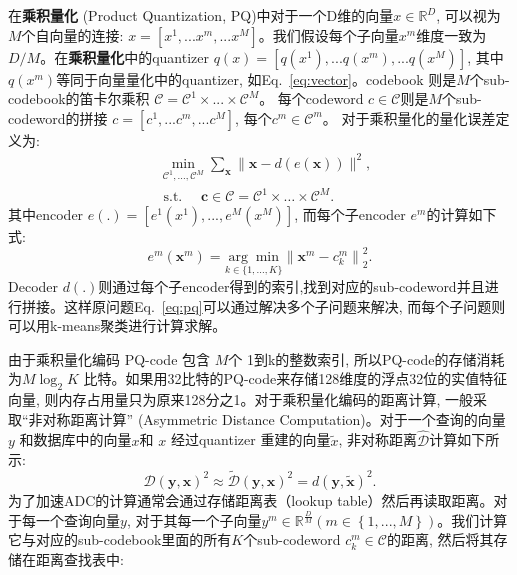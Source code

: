 在\textbf{乘积量化} (Product Quantization, PQ)中对于一个D维的向量$x \in \mathbb{R}^D$, 可以视为$M$个自向量的连接: $x = \left[ x^1,...x^m,...x^M \right]$。我们假设每个子向量$x^m$维度一致为$D/M$。在\textbf{乘积量化}中的quantizer $q(x) = \left[ q(x^1),...q(x^m),...q(x^M) \right]$, 其中 $q(x^m)$等同于向量量化中的quantizer, 如Eq.~\ref{eq:vector}。codebook 则是$M$个sub-codebook的笛卡尔乘积 $\mathcal{C} = \mathcal{C}^1 \times ... \times \mathcal{C}^M$。 每个codeword $c \in \mathcal{C}$则是$M$个sub-codeword的拼接 $c = \left[ c^1,...c^m,...c^M\right]$, 每个$c^m \in \mathcal{C}^m$。 对于乘积量化的量化误差定义为:
\begin{equation}
    \begin{aligned}
        & \min _{\mathcal{C}^1, \ldots, \mathcal{C}^M} \sum_{\mathbf{x}}\|\mathbf{x}-d(e(\mathbf{x}))\|^2, \\
        & \text { s.t. } \quad \mathbf{c} \in \mathcal{C}=\mathcal{C}^1 \times \ldots \times \mathcal{C}^M .
        \label{eq:pq}
        \end{aligned}
\end{equation}
其中encoder $e(.) = \left[ e^1(x^1) ,..., e^M(x^M)\right]$, 而每个子encoder $e^m$的计算如下式:
\begin{equation}
    e^m\left(\mathbf{x}^m\right)=\underset{k \in\{1, \ldots, K\}}{\arg \min }\left\|\mathbf{x}^m-c_k^m\right\|_2^2.
\end{equation}
Decoder $d(.)$则通过每个子encoder得到的索引,找到对应的sub-codeword并且进行拼接。这样原问题Eq.~\ref{eq:pq}可以通过解决多个子问题来解决, 而每个子问题则可以用k-means聚类进行计算求解。 \par
由于乘积量化编码 PQ-code 包含 $M$个 1到k的整数索引, 所以PQ-code的存储消耗为$M\log_2K$ 比特。如果用32比特的PQ-code来存储128维度的浮点32位的实值特征向量, 则内存占用量只为原来128分之1。对于乘积量化编码的距离计算, 一般采取``非对称距离计算'' (Asymmetric Distance Computation)。对于一个查询的向量 $y$ 和数据库中的向量$x$和 $x$ 经过quantizer 重建的向量$\tilde{x}$, 非对称距离$\hat{\mathcal{D}}$计算如下所示:
\begin{equation}
    \mathcal{D}(\mathbf{y}, \mathbf{x})^2 \approx \tilde{\mathcal{D}}(\mathbf{y}, \mathbf{x})^2=d(\mathbf{y}, \tilde{\mathbf{x}})^2.
\end{equation}
为了加速ADC的计算通常会通过存储距离表（lookup table）然后再读取距离。对于每一个查询向量$y$, 对于其每一个子向量$y^m \in \mathbb{R}^{\frac{D}{M}} (m \in \left \{ 1,...,M  \right \})$。我们计算它与对应的sub-codebook里面的所有$K$个sub-codeword $c_k^m \in \mathcal{C}$的距离, 然后将其存储在距离查找表中:
